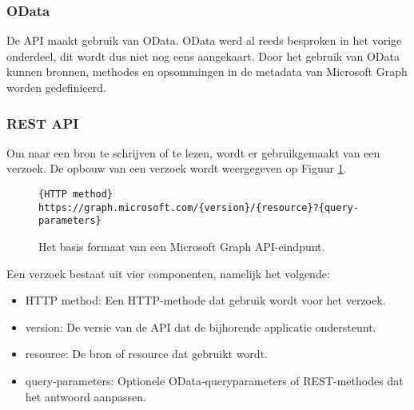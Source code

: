 \subsubsection{OData}

De \ac{API} maakt gebruik van OData. OData werd al reeds besproken in het vorige onderdeel, dit wordt dus niet nog eens aangekaart. Door het gebruik van OData kunnen bronnen, methodes en opsommingen in de metadata van Microsoft Graph worden gedefinieerd.

\subsubsection{REST API}

Om naar een bron te schrijven of te lezen, wordt er gebruikgemaakt van een verzoek. De opbouw van een verzoek wordt weergegeven op Figuur \ref{RAM}. \\

\begin{figure}[h]
    \footnotesize\begin{verbatim}{HTTP method} https://graph.microsoft.com/{version}/{resource}?{query-parameters}
    \end{verbatim}    
    \caption[Basis formaat Microsoft Graph API-eindpunt]{Het basis formaat van een Microsoft Graph \Ac{API}-eindpunt.}
    \label{RAM}
\end{figure}

Een verzoek bestaat uit vier componenten, namelijk het volgende:

\begin{itemize}
    \item \ac{HTTP} method: Een \ac{HTTP}-methode dat gebruik wordt voor het verzoek.
    \item version: De versie van de \ac{API} dat de bijhorende applicatie ondersteunt.
    \item resource: De bron of resource dat gebruikt wordt.
    \item query-parameters: Optionele OData-queryparameters of \Ac{REST}-methodes dat het antwoord aanpassen.
\end{itemize}

\begin{comment}
Wanneer er een verzoek wordt verstuurd, krijgt dit ook een antwoord terug. Een antwoord bestaat uit minstens volgende onderdelen: 

\begin{itemize}
    \item Status code:
    \item Response message:
    \item @odata.nextLink:
\end{itemize}
\end{comment}

